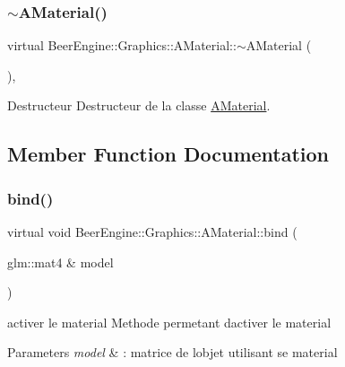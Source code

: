 \subsubsection{\texorpdfstring{$\sim$\+A\+Material()}{~AMaterial()}}
{\footnotesize\ttfamily virtual Beer\+Engine\+::\+Graphics\+::\+A\+Material\+::$\sim$\+A\+Material (\begin{DoxyParamCaption}{ }\end{DoxyParamCaption})\hspace{0.3cm}{\ttfamily [inline]}, {\ttfamily [virtual]}}



Destructeur Destructeur de la classe \mbox{\hyperlink{class_beer_engine_1_1_graphics_1_1_a_material}{A\+Material}}. 



\subsection{Member Function Documentation}
\mbox{\label{class_beer_engine_1_1_graphics_1_1_a_material_a9f656d86c291077f108f62b19809aae1}} 
\subsubsection{\texorpdfstring{bind()}{bind()}}
{\footnotesize\ttfamily virtual void Beer\+Engine\+::\+Graphics\+::\+A\+Material\+::bind (\begin{DoxyParamCaption}\item[{glm\+::mat4 \&}]{model }\end{DoxyParamCaption})\hspace{0.3cm}{\ttfamily [virtual]}}



activer le material Methode permetant d\textquotesingle{}activer le material 


\begin{DoxyParams}{Parameters}
{\em model} & \+: matrice de l\textquotesingle{}objet utilisant se material \\
\hline
\end{DoxyParams}
\mbox{\label{class_beer_engine_1_1_graphics_1_1_a_material_afa6ac6e48d4433d62777d5fe9984faaa}} 

